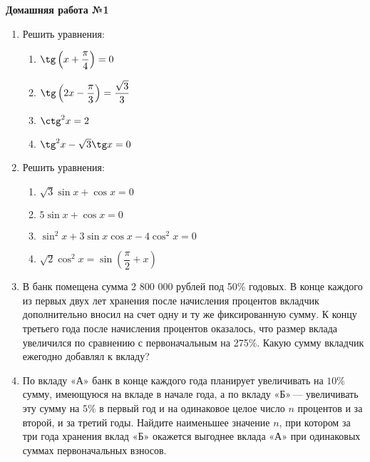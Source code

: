 \documentclass[12pt, a4paper]{article}
\begin{document}
	   \cfoot{}
	\begin{center}
		\Large
		\textbf{Домашняя работа №1}
	\end{center}
	\begin{enumerate}[label=\textbf{\arabic*.}]
		\item Решить уравнения:
		\begin{multicols}{2}
			\begin{enumerate}[label=\asbuk*)]
				\item \( \tg\left( x+\dfrac{\pi}{4} \right) = 0 \)
				\item \( \tg\left( 2x-\dfrac{\pi}{3} \right)=\dfrac{\sqrt{3}}{3} \)
				\item \( \ctg^2 x = 2 \)
				\item \( \tg^2 x - \sqrt{3}\tg x = 0 \)
			\end{enumerate}
		\end{multicols}
		\item Решить уравнения:
		\begin{multicols}{2}
			\begin{enumerate}[label=\asbuk*)]
				\item \( \sqrt{3}\sin x + \cos x = 0 \)
				\item \( 5\sin x + \cos x = 0 \)
				\item \( \sin^2 x + 3\sin x\cos x - 4\cos^2 x = 0\)
				\item \( \sqrt{2}\cos^2x=\sin\left( \dfrac{\pi}{2}+x \right) \)
			\end{enumerate}
		\end{multicols}
		\item В банк помещена сумма 2 800 000 рублей под 50\% годовых. В конце каждого из первых двух лет хранения после начисления процентов вкладчик дополнительно вносил на счет одну и ту же фиксированную сумму. К концу третьего года после начисления процентов оказалось, что размер вклада увеличился по сравнению с первоначальным на 275\%. Какую сумму вкладчик ежегодно добавлял к вкладу?
		\item По вкладу «А» банк в конце каждого года планирует увеличивать на \( 10\% \) сумму, имеющуюся на вкладе в начале года, а по вкладу «Б» — увеличивать эту сумму на \( 5\% \) в первый год и на одинаковое целое число \( n \) процентов и за второй, и за третий годы. Найдите наименьшее значение \( n \), при котором за три года хранения вклад «Б» окажется выгоднее вклада «А» при одинаковых суммах первоначальных взносов.
	\end{enumerate}
\end{document}
